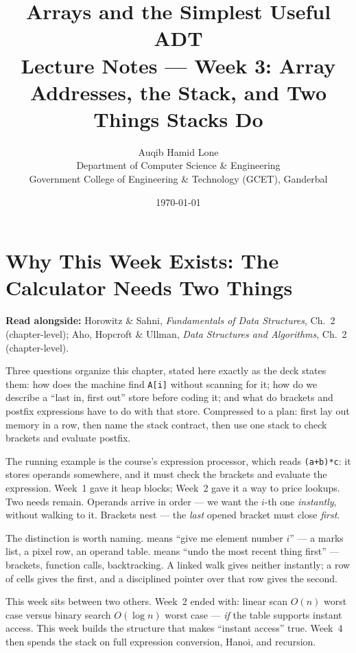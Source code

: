 \documentclass[11pt]{article}
\title{Arrays and the Simplest Useful ADT\\\large Lecture Notes --- Week 3: Array Addresses, the Stack, and Two Things Stacks Do}
\author{Auqib Hamid Lone\\[0.3em]
  \small Department of Computer Science \& Engineering\\
  \small Government College of Engineering \& Technology (GCET), Ganderbal}
\date{\today}
\begin{document}
\maketitle

\section{Why This Week Exists: The Calculator Needs Two Things}

\textbf{Read alongside:} Horowitz \& Sahni, \textit{Fundamentals of Data Structures}, Ch.~2 (chapter-level); Aho, Hopcroft \& Ullman, \textit{Data Structures and Algorithms}, Ch.~2 (chapter-level).

Three questions organize this chapter, stated here exactly as the deck states them: how does the machine find \texttt{A[i]} without scanning for it; how do we describe a ``last in, first out'' store before coding it; and what do brackets and postfix expressions have to do with that store. Compressed to a plan: first lay out memory in a row, then name the stack contract, then use one stack to check brackets and evaluate postfix.

The running example is the course's expression processor, which reads \texttt{(a+b)*c}: it stores operands somewhere, and it must check the brackets and evaluate the expression. Week~1 gave it heap blocks; Week~2 gave it a way to price lookups. Two needs remain. Operands arrive in order --- we want the $i$-th one \emph{instantly}, without walking to it. Brackets nest --- the \emph{last} opened bracket must close \emph{first}. 

The distinction is worth naming.  means ``give me element number $i$'' --- a marks list, a pixel row, an operand table.  means ``undo the most recent thing first'' --- brackets, function calls, backtracking. A linked walk gives neither instantly; a row of cells gives the first, and a disciplined pointer over that row gives the second. 

This week sits between two others. Week~2 ended with: linear scan $O(n)$ worst case versus binary search $O(\log n)$ worst case --- \emph{if} the table supports instant access. This week builds the structure that makes ``instant access'' true. Week~4 then spends the stack on full expression conversion, Hanoi, and recursion. 
\end{document}

